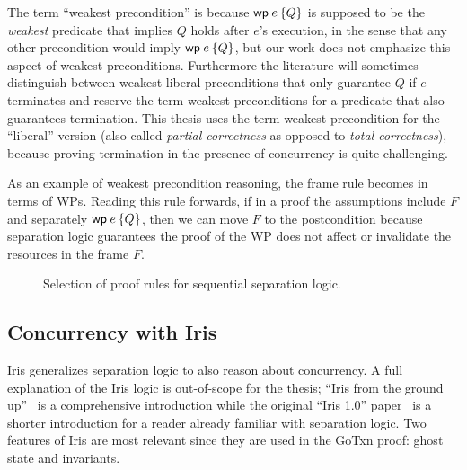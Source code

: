 The term ``weakest precondition'' is because $\wpre{e}{Q}$ is supposed to be the
\emph{weakest} predicate that implies $Q$ holds after $e$'s execution, in the
sense that any other precondition would imply $\wpre{e}{Q}$, but our work does not
emphasize this aspect of weakest preconditions. Furthermore the literature will
sometimes distinguish between weakest liberal preconditions that only guarantee
$Q$ if $e$ terminates and reserve the term weakest preconditions for a predicate
that also guarantees termination. This thesis uses the term weakest precondition for the
``liberal'' version (also called \emph{partial correctness} as opposed to
\emph{total correctness}), because proving termination in the presence of
concurrency is quite challenging.

As an example of weakest precondition reasoning, the frame rule becomes
 in terms of WPs. Reading this rule forwards, if in a proof
the assumptions include $F$
and separately $\wpre{e}{Q}$, then we can move $F$ to the postcondition because
separation logic guarantees the proof of the WP does not affect or invalidate
the resources in the frame $F$.

\begin{figure}
\caption{Selection of proof rules for sequential separation logic.}
\label{fig:wp-rules}
\end{figure}

\subsection{Concurrency with Iris}
\label{sec:perennial:concurrency}

Iris generalizes separation logic to also reason about concurrency. A full
explanation of the Iris logic is out-of-scope for the thesis; ``Iris from the
ground up''~\cite{jung:iris-jfp} is a comprehensive introduction while the
original ``Iris 1.0'' paper~\cite{jung:iris-1} is a shorter introduction for a
reader already familiar with separation logic. Two features of Iris are most
relevant since they are used in the GoTxn proof: ghost state and invariants.

